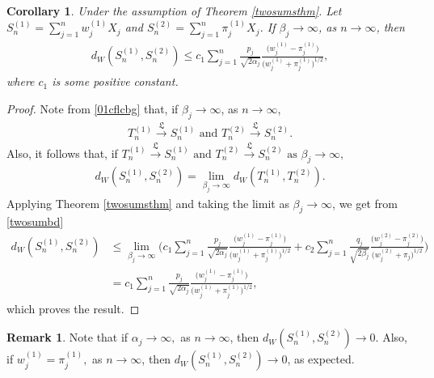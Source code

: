 \documentclass[12pt, a4paper,reqno]{amsart}
\newtheorem{cor}[thm]{Corollary}
\theoremstyle{definition}
\theoremstyle{myremark}
\newtheorem{rem}[thm]{Remark}
\numberwithin{equation}{section}
\begin{document}
\begin{cor}
	Under the assumption of Theorem \ref{twosumsthm}. Let $S_n^{(1)}= \sum_{j=1}^{n}w_j^{(1)}X_j$ and  $S_n^{(2)}= \sum_{j=1}^{n}\pi_j^{(1)}X_j$. If $\beta_j \to \infty$, as $n\to \infty$, then
	\begin{align*}
	d_W(S_n^{(1)},S_n^{(2)}) \leq c_1 \sum_{j=1}^{n}\frac{p_j}{\sqrt{2\alpha_j}} \frac{ \big(w_j^{(1)} - \pi_{j}^{(1)}\big) }{\big(w_j^{(1)} + \pi_{j}^{(1)}\big)^{1/2}},
	\end{align*}
	where $c_1$ is some positive constant.
\end{cor}
\begin{proof}
Note from \eqref{01cflcbg} that, if $\beta_j \to \infty$, as $n\to \infty$,
\begin{align*}
T_n^{(1)} \overset{\mathfrak{L}}{\to} S_n^{(1)} \text{ and }T_n^{(2)} \overset{\mathfrak{L}}{\to} S_n^{(2)}.
\end{align*}
Also, it follows \cite[Theorem 7.12]{Villani} that, if $T_n^{(1)} \overset{\mathfrak{L}}{\to} S_n^{(1)} \text{ and }T_n^{(2)} \overset{\mathfrak{L}}{\to} S_n^{(2)} \text{ as }\beta_j \to \infty,$
\begin{align*}
d_W(S_n^{(1)},S_n^{(2)})=\lim_{\beta_j \to \infty}d_W(T_n^{(1)},T_n^{(2)}).
\end{align*}
\noindent
Applying Theorem \ref{twosumsthm} and taking the limit as $\beta_j \to \infty$, we get from
\eqref{twosumbd}
\begin{align*}
d_W(S_n^{(1)},S_n^{(2)}) &\leq \lim_{\beta_j \to \infty} \bigg(c_1 \sum_{j=1}^{n}\frac{p_j}{\sqrt{2\alpha_j}} \frac{ \big(w_j^{(1)} - \pi_{j}^{(1)}\big) }{\big(w_j^{(1)} + \pi_{j}^{(1)}\big)^{1/2}}+c_2\sum_{j=1}^{n}\frac{q_j}{\sqrt{2\beta_j}}\frac{\big(w_j^{(2)}-\pi_{j}^{(2)}\big)}{\big(w_j^{(2)}+\pi_{j}\big)^{1/2}} \bigg) \\
 &=c_1 \sum_{j=1}^{n}\frac{p_j}{\sqrt{2\alpha_j}} \frac{ \big(w_j^{(1)} - \pi_{j}^{(1)}\big) }{\big(w_j^{(1)} + \pi_{j}^{(1)}\big)^{1/2}},
\end{align*}
\noindent
which proves the result.
\end{proof}
\begin{rem}
 Note that if $\alpha_j \to \infty,$ as $n\to \infty$, then $d_W(S_n^{(1)},S_n^{(2)}) \to 0.$
 Also, if $w_j^{(1)}=\pi_j^{(1)},$ as $n\to \infty$, then $d_W(S_n^{(1)},S_n^{(2)} ) \to 0$, as expected.
\end{rem}
\end{document}
